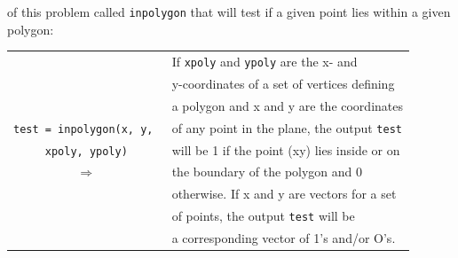 \documentclass[../main.tex]{subfiles}
\begin{document}
\begin{enumerate}
of this problem called \texttt{inpolygon} that will test if a given point lies within a given polygon: 
\begin{center}
\begin{tabular}{|c|l|}
\hline
 &If \texttt{xpoly} and \texttt{ypoly} are the x- and \\
 &y-coordinates of a set of vertices defining \\
 &a polygon and x and y are the coordinates \\
 \texttt{test = inpolygon(x, y, }&of any point in the plane, the output \texttt{test}\\
 \texttt{xpoly, ypoly)}&will be 1 if the point (xy) lies inside or on\\
 $\Rightarrow$&the boundary of the polygon and 0\\
 &otherwise. If x and y are vectors for a set\\
 &of points, the output \texttt{test} will be\\
 & a corresponding vector of 1's and/or O's.\\
 

\end{tabular}
\end{center}
\end{enumerate}
\end{document}
